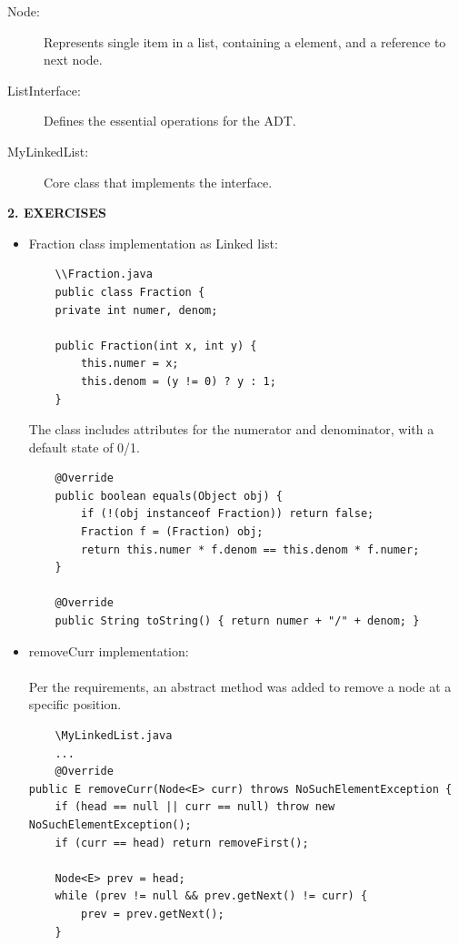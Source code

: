 \documentclass[12pt]{article}
\begin{document}
\begin{description}
    \item[Node:] Represents single item in a list, containing a element, and a reference to next node.
    \item[ListInterface:] Defines the essential operations for the ADT.
    \item[MyLinkedList:] Core class that implements the interface.
\end{description}


\textbf{2. EXERCISES}
\begin{itemize}

\item[\textbf{Exercise 1. }] Fraction class implementation as Linked list:
\begin{verbatim}
    \\Fraction.java
    public class Fraction {
    private int numer, denom;

    public Fraction(int x, int y) {
        this.numer = x;
        this.denom = (y != 0) ? y : 1;
    }
\end{verbatim}
The class includes attributes for the numerator and denominator, with a default state of 0/1.
\begin{verbatim}
    @Override
    public boolean equals(Object obj) {
        if (!(obj instanceof Fraction)) return false;
        Fraction f = (Fraction) obj;
        return this.numer * f.denom == this.denom * f.numer;
    }

    @Override
    public String toString() { return numer + "/" + denom; }
\end{verbatim}

\item[\textbf{Exercise 2. }] removeCurr implementation: 
\\\\
Per the requirements, an abstract method was added to remove a node at a specific position. 
\begin{verbatim}
    \MyLinkedList.java
    ...
    @Override
public E removeCurr(Node<E> curr) throws NoSuchElementException {
    if (head == null || curr == null) throw new NoSuchElementException();
    if (curr == head) return removeFirst();

    Node<E> prev = head;
    while (prev != null && prev.getNext() != curr) {
        prev = prev.getNext();
    }


\end{verbatim}
\end{itemize}
\end{document}
